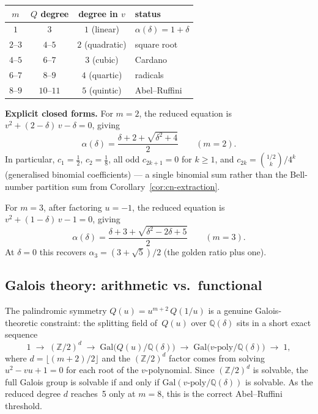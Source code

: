 \documentclass[11pt,a4paper]{article}
\theoremstyle{plain}
\theoremstyle{definition}
\begin{document}
\medskip
\begin{center}
\begin{tabular}{@{}cccl@{}}
\toprule
$m$ & $Q$ degree & degree in $v$ & status \\
\midrule
$1$ & $3$ & $1$ (linear) & $\alpha(\delta) = 1 + \delta$ \\
$2$--$3$ & $4$--$5$ & $2$ (quadratic) & square root \\
$4$--$5$ & $6$--$7$ & $3$ (cubic) & Cardano \\
$6$--$7$ & $8$--$9$ & $4$ (quartic) & radicals \\
$8$--$9$ & $10$--$11$ & $5$ (quintic) & Abel--Ruffini \\
\bottomrule
\end{tabular}
\end{center}
\medskip

\noindent\textbf{Explicit closed forms.}
For $m = 2$, the reduced equation is $v^2 + (2{-}\delta)\,v - \delta = 0$,
giving
\[
  \boxed{\alpha(\delta) = \frac{\delta + 2 + \sqrt{\delta^2 + 4}}{2}}
  \qquad (m = 2).
\]
In particular, $c_1 = \tfrac12$, $c_2 = \tfrac18$, all odd $c_{2k+1} = 0$
for $k \ge 1$, and
$c_{2k} = \binom{1/2}{k} / 4^k$ (generalised binomial coefficients)
--- a single binomial sum rather than the Bell-number partition sum
from Corollary~\ref{cor:cn-extraction}.

For $m = 3$, after factoring $u = -1$, the reduced equation is
$v^2 + (1{-}\delta)\,v - 1 = 0$, giving
\[
  \boxed{\alpha(\delta) = \frac{\delta + 3 + \sqrt{\delta^2 - 2\delta + 5}}{2}}
  \qquad (m = 3).
\]
At $\delta = 0$ this recovers $\alpha_3 = (3 + \sqrt{5})/2$
(the golden ratio plus one).

\subsection{Galois theory: arithmetic vs.\ functional}
\label{sec:galois}

The palindromic symmetry $Q(u) = u^{m+2}\,Q(1/u)$ is a genuine
Galois-theoretic constraint: the splitting field of~$Q(u)$ over
$\mathbb{Q}(\delta)$ sits in a short exact sequence
\[
  1 \;\longrightarrow\; (\mathbb{Z}/2)^d
  \;\longrightarrow\; \mathrm{Gal}\bigl(Q(u)/\mathbb{Q}(\delta)\bigr)
  \;\longrightarrow\; \mathrm{Gal}\bigl(\text{$v$-poly}/\mathbb{Q}(\delta)\bigr)
  \;\longrightarrow\; 1,
\]
where $d = \lfloor(m{+}2)/2\rfloor$ and the $(\mathbb{Z}/2)^d$ factor
comes from solving $u^2 - vu + 1 = 0$ for each root of the
$v$-polynomial.
Since $(\mathbb{Z}/2)^d$ is solvable, the full Galois group is
solvable if and only if $\mathrm{Gal}(\text{$v$-poly}/\mathbb{Q}(\delta))$
is solvable.  As the reduced degree $d$ reaches~5 only at $m = 8$,
this is the correct Abel--Ruffini threshold.
\end{document}
